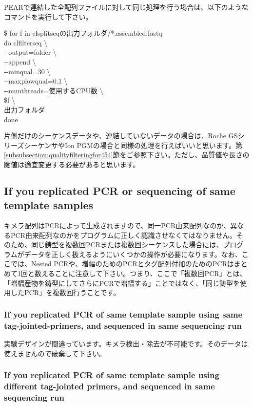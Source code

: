 \documentclass[titlepage,10pt,a4paper,english]{jsbook}
\newenvironment{cmd}{\begin{oframed}\raggedright\ttfamily\footnotesize\setlength{\baselineskip}{1.4em}}{\end{oframed}\vspace{-1em}}
\begin{document}
PEARで連結した全配列ファイルに対して同じ処理を行う場合は、以下のようなコマンドを実行して下さい。

\begin{cmd}
\$ for f in clsplitseqの出力フォルダ/*.assembled.fastq\\
do clfilterseq {\textbackslash}\\
{-}{-}output=folder {\textbackslash}\\
{-}{-}append {\textbackslash}\\
{-}{-}minqual=30 {\textbackslash}\\
{-}{-}maxplowqual=0.1 {\textbackslash}\\
{-}{-}numthreads=使用するCPU数 {\textbackslash}\\
\$f {\textbackslash}\\
出力フォルダ\\
done
\end{cmd}

片側だけのシーケンスデータや、連結していないデータの場合は、Roche GSシリーズシーケンサやIon PGMの場合と同様の処理を行えばいいと思います。第\ref{subsubsection:qualityfilteringfor454}節をご参照下さい。ただし、品質値や長さの閾値は適宜変更する必要があると思います。

\subsection{If you replicated PCR or sequencing of same template samples}

キメラ配列はPCRによって生成されますので、同一PCR由来配列なのか、異なるPCR由来配列なのかをプログラムに正しく認識させなくてはなりません。そのため、同じ鋳型を複数回PCRまたは複数回シーケンスした場合には、プログラムがデータを正しく扱えるようにいくつかの操作が必要になります。なお、ここでは、Nested PCRや、増幅のためのPCRとタグ配列付加のためのPCRはまとめて1回と数えることに注意して下さい。つまり、ここで「複数回PCR」とは、「増幅産物を鋳型にしてさらにPCRで増幅する」ことではなく、「同じ鋳型を使用したPCR」を複数回行うことです。

\subsubsection{If you replicated PCR of same template sample using same tag-jointed-primers, and sequenced in same sequencing run}

実験デザインが間違っています。キメラ検出・除去が不可能です。そのデータは使えませんので破棄して下さい。

\subsubsection{If you replicated PCR of same template sample using different tag-jointed primers, and sequenced in same sequencing run}
\end{document}
